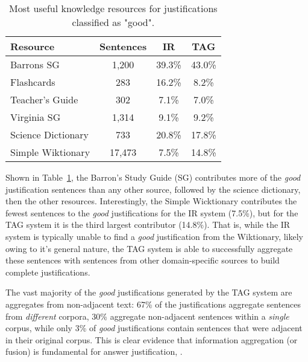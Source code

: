 %
%
\begin{table}[t]
\small
\begin{center}
\begin{tabular}{lccc}
\hline
\multicolumn{1}{l}{Resource} & \multicolumn{1}{c}{Sentences} &\multicolumn{1}{c}{IR} & \multicolumn{1}{c}{TAG}  \\
\cline{2-3}
\hline
Barrons SG 			& 1,200		&	39.3\%		& 43.0\%	\\
Flashcards			& 283		&	16.2\%		& 8.2\%	\\
Teacher's Guide		& 302		&	7.1\%		& 7.0\%	\\
Virginia SG			& 1,314		&	9.1\%		& 9.2\%	\\
Science Dictionary	& 733		&	20.8\%		& 17.8\%	\\
Simple Wiktionary	& 17,473		&	7.5\%		& 14.8\%	\\

\end{tabular}
\caption{{ Most useful knowledge resources for justifications classified as "good".}}

\label{tab:justificationknowledgeresources}
\end{center}
\end{table}

{} Shown in Table~\ref{tab:justificationknowledgeresources}, the Barron's Study Guide (SG) contributes more of the \emph{good} justification sentences than any other source, followed by the science dictionary, then the other resources.  Interestingly, the Simple Wicktionary contributes the fewest sentences to the \emph{good} justifications for the IR system (7.5\%), but for the TAG system it is the third largest contributor (14.8\%).  That is, while the IR system is typically unable to find a \emph{good} justification from the Wiktionary, likely owing to it's general nature, the TAG system is able to successfully aggregate these sentences with sentences from other domain-specific sources to build complete justifications.

The vast majority of the \emph{good} justifications generated by the TAG system are aggregates from non-adjacent text: 67\% of the justifications aggregate sentences from \emph{different} corpora, 30\% aggregate non-adjacent sentences within a \emph{single} corpus, while only 3\% of \emph{good} justifications contain sentences that were adjacent in their original corpus. 
This is clear evidence that information aggregation (or fusion) is fundamental for answer justification, .


